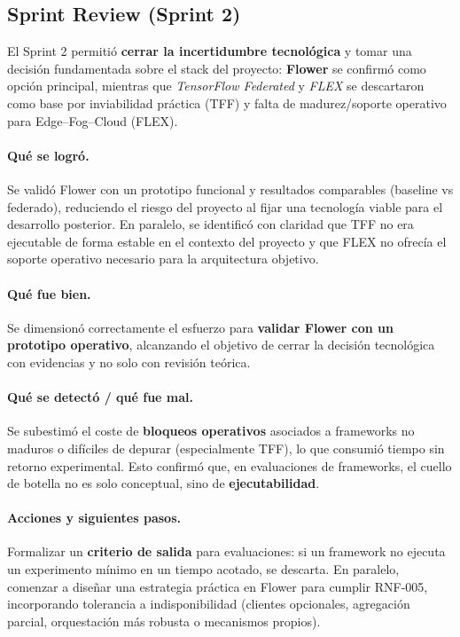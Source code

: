\documentclass{report}
\begin{document}
\subsection{Sprint Review (Sprint 2)}
El Sprint 2 permitió \textbf{cerrar la incertidumbre tecnológica} y tomar una decisión fundamentada sobre el stack del proyecto: \textbf{Flower} se confirmó como opción principal, mientras que \textit{TensorFlow Federated} y \emph{FLEX} se descartaron como base por inviabilidad práctica (TFF) y falta de madurez/soporte operativo para Edge--Fog--Cloud (FLEX).

\vspace{0.15em}
\paragraph{Qué se logró.}
Se validó Flower con un prototipo funcional y resultados comparables (baseline vs federado), reduciendo el riesgo del proyecto al fijar una tecnología viable para el desarrollo posterior. En paralelo, se identificó con claridad que TFF no era ejecutable de forma estable en el contexto del proyecto y que FLEX no ofrecía el soporte operativo necesario para la arquitectura objetivo.

\vspace{0.15em}
\paragraph{Qué fue bien.}
Se dimensionó correctamente el esfuerzo para \textbf{validar Flower con un prototipo operativo}, alcanzando el objetivo de cerrar la decisión tecnológica con evidencias y no solo con revisión teórica.

\vspace{0.15em}
\paragraph{Qué se detectó / qué fue mal.}
Se subestimó el coste de \textbf{bloqueos operativos} asociados a frameworks no maduros o difíciles de depurar (especialmente TFF), lo que consumió tiempo sin retorno experimental. Esto confirmó que, en evaluaciones de frameworks, el cuello de botella no es solo conceptual, sino de \textbf{ejecutabilidad}.

\vspace{0.15em}
\paragraph{Acciones y siguientes pasos.}
Formalizar un \textbf{criterio de salida} para evaluaciones: si un framework no ejecuta un experimento mínimo en un tiempo acotado, se descarta. En paralelo, comenzar a diseñar una estrategia práctica en Flower para cumplir RNF-005, incorporando tolerancia a indisponibilidad (clientes opcionales, agregación parcial, orquestación más robusta o mecanismos propios).
\end{document}
